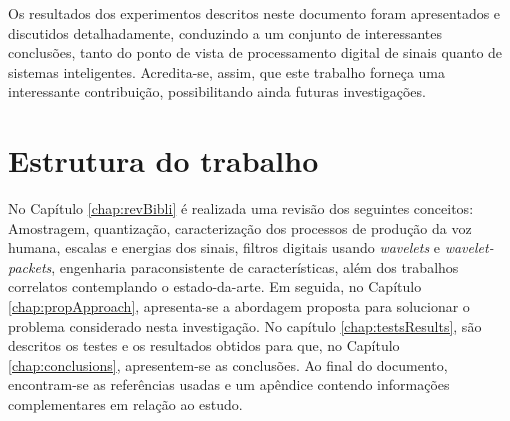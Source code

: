		\par Os resultados dos experimentos descritos neste documento foram apresentados e discutidos detalhadamente, conduzindo a um conjunto de interessantes conclusões, tanto do ponto de vista de processamento digital de sinais quanto de sistemas inteligentes. Acredita-se, assim, que este trabalho forneça uma interessante contribuição, possibilitando ainda futuras investigações. 
	
	\section{Estrutura do trabalho}
		\par No Capítulo \ref{chap:revBibli} é realizada uma revisão dos seguintes conceitos: Amostragem, quantização, caracterização dos processos de produção da voz humana, escalas e energias dos sinais, filtros digitais usando \textit{wavelets} e \textit{wavelet-packets}, engenharia paraconsistente de características, além dos trabalhos correlatos contemplando o estado-da-arte. Em seguida, no Capítulo \ref{chap:propApproach}, apresenta-se a abordagem proposta para solucionar o problema considerado nesta investigação. No capítulo \ref{chap:testsResults}, são descritos os testes e os resultados obtidos para que, no Capítulo \ref{chap:conclusions}, apresentem-se as conclusões. Ao final do documento, encontram-se as referências usadas e um apêndice contendo informações complementares em relação ao estudo.